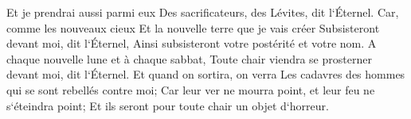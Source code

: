 \verse Et je prendrai aussi parmi eux Des sacrificateurs, des Lévites, dit l`Éternel. 
\verse Car, comme les nouveaux cieux Et la nouvelle terre que je vais créer Subsisteront devant moi, dit l`Éternel, Ainsi subsisteront votre postérité et votre nom. 
\verse A chaque nouvelle lune et à chaque sabbat, Toute chair viendra se prosterner devant moi, dit l`Éternel. 
\verse Et quand on sortira, on verra Les cadavres des hommes qui se sont rebellés contre moi; Car leur ver ne mourra point, et leur feu ne s`éteindra point; Et ils seront pour toute chair un objet d`horreur. 
